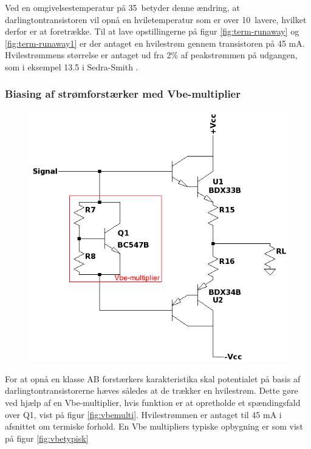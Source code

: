 Ved en omgivelsestemperatur på 35~\celsius betyder denne ændring, at darlingtontransistoren vil opnå en hviletemperatur som er over 10~\celsius lavere, hvilket derfor er at foretrække. Til at lave opstillingerne på figur \ref{fig:term-runaway} og \ref{fig:term-runaway1} er der antaget en hvilestrøm gennem transistoren på 45 mA. Hvilestrømmens størrelse er antaget ud fra 2\% af peakstrømmen på udgangen, som i eksempel 13.5 i Sedra-Smith .


\subsubsection*{Biasing af strømforstærker med Vbe-multiplier}

\begin{figure}[h]
\centering
\includegraphics[scale=.6]{teknisk/effektforstaerker/vbemultiplieropbygning.png}
\caption{}
\label{}
\end{figure}


For at opnå en klasse AB forstærkers karakteristika skal potentialet på basis af darlingtontransistorerne hæves således at de trækker en hvilestrøm. Dette gøre ved hjælp af en Vbe-multiplier, hvis funktion er at opretholde et spændingsfald over Q1, vist på figur \ref{fig:vbemulti}.  Hvilestrømmen er antaget til 45 mA i afsnittet om termiske forhold. En Vbe multipliers typiske opbygning er som vist på figur \ref{fig:vbetypisk}



